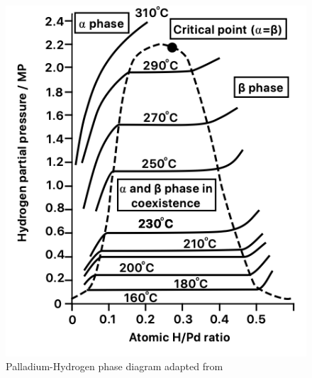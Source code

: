 \begin{figure}[H]
    \includegraphics[width=\linewidth]{figures/alphabeta.png}
    \caption{Palladium-Hydrogen phase diagram adapted from \cite{Li2008b}}
    \label{alphabeta}
  \end{figure}


